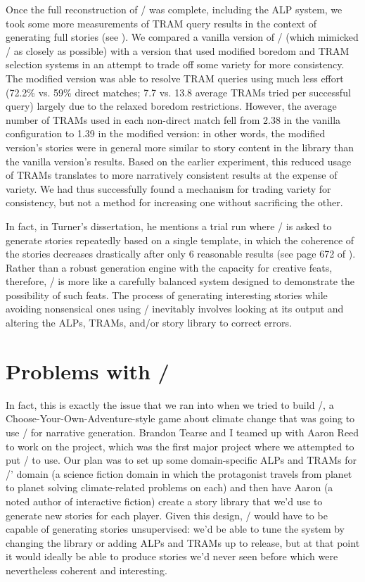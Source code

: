 Once the full reconstruction of \minstrel/ was complete, including the ALP system, we took some more measurements of TRAM query results in the context of generating full stories (see \citep{Tearse2012}).
%
We compared a vanilla version of \skald/ (which mimicked \minstrel/ as closely as possible) with a version that used modified boredom and TRAM selection systems in an attempt to trade off some variety for more consistency.
%
The modified version was able to resolve TRAM queries using much less effort (72.2\% vs. 59\% direct matches; 7.7 vs. 13.8 average TRAMs tried per successful query) largely due to the relaxed boredom restrictions.
%
However, the average number of TRAMs used in each non-direct match fell from 2.38 in the vanilla configuration to 1.39 in the modified version: in other words, the modified version's stories were in general more similar to story content in the library than the vanilla version's results.
%
Based on the earlier experiment, this reduced usage of TRAMs translates to more narratively consistent results at the expense of variety. 
%
We had thus successfully found a mechanism for trading variety for consistency, but not a method for increasing one without sacrificing the other.


In fact, in Turner's dissertation, he mentions a trial run where \minstrel/ is asked to generate stories repeatedly based on a single template, in which the coherence of the stories decreases drastically after only 6 reasonable results (see page 672 of \citep{Turner1993}).
%
Rather than a robust generation engine with the capacity for creative feats, therefore, \minstrel/ is more like a carefully balanced system designed to demonstrate the possibility of such feats.
%
The process of generating interesting stories while avoiding nonsensical ones using \minstrel/ inevitably involves looking at its output and altering the ALPs, TRAMs, and/or story library to correct errors.


\section{Problems with \problemplanets/}

\label{sec:problem-planets-problems}

In fact, this is exactly the issue that we ran into when we tried to build \problemplanets/, a Choose-Your-Own-Adventure-style game about climate change that was going to use \skald/ for narrative generation.
%
Brandon Tearse and I teamed up with Aaron Reed to work on the project, which was the first major project where we attempted to put \skald/ to use.
%
Our plan was to set up some domain-specific ALPs and TRAMs for \problemplanets/' domain (a science fiction domain in which the protagonist travels from planet to planet solving climate-related problems on each) and then have Aaron (a noted author of interactive fiction) create a story library that we'd use to generate new stories for each player.
%
Given this design, \skald/ would have to be capable of generating stories unsupervised: we'd be able to tune the system by changing the library or adding ALPs and TRAMs up to release, but at that point it would ideally be able to produce stories we'd never seen before which were nevertheless coherent and interesting.


